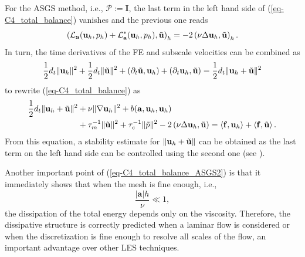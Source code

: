 For the ASGS method, i.e., $\mathcal{P}:=\mathbf{I}$, the last term in the left hand side of (\ref{eq-C4_total_balance}) vanishes and the previous one reads
\begin{equation}
\left(\mathcal{L}_{{\bf a}}({\bf u}_h,p_h)+\mathcal{L}^*_{{\bf a}}({\bf u}_h,p_h),\tilde{{\bf u}}\right)_h=
-2 \left(\nu\Delta{\bf u}_h,\tilde{{\bf u}}\right)_h.
\end{equation}
In turn, the time derivatives of the FE and subscale velocities can be combined as
\begin{align}
\label{eq-C4_time_deriv_ASGS}
\frac{1}{2}d_t\|{\bf u}_h\|^2+\frac{1}{2}d_t\|\tilde{{\bf u}}\|^2+(\partial_t\tilde{{\bf u}},{\bf u}_h)+\left(\partial_t{\bf u}_h,\tilde{{\bf u}}\right)=\frac{1}{2}d_t\|{\bf u}_h+\tilde{{\bf u}}\|^2
\end{align}
to rewrite (\ref{eq-C4_total_balance}) as
\begin{align}
\label{eq-C4_total_balance_ASGS2}
\frac{1}{2}d_t\|{\bf u}_h+\tilde{{\bf u}}\|^2
&+\nu\|\nabla{\bf u}_h\|^2+b({\bf a},{\bf u}_h,{\bf u}_h) \\ \nonumber
&+\tau_m^{-1}\|\tilde{{\bf u}}\|^2+\tau_c^{-1}\|\tilde{p}\|^2-2 \left(\nu\Delta{\bf u}_h,\tilde{{\bf u}}\right)=\left<\mathbf{f},\mathbf{u}_h\right>+\left<\mathbf{f},\tilde{{\bf u}}\right>.
\end{align}
From this equation, a stability estimate for $\|{\bf u}_h+\tilde{{\bf u}}\|$ can be obtained as the last term on the left hand side can be controlled using the second one (see \cite[Remark 4.7]{badia_multiscale_2009}).%

Another important point of (\ref{eq-C4_total_balance_ASGS2}) is that it immediately shows that when the mesh is fine enough, i.e., 
\begin{equation*}
\frac{\left| \mathbf{a}\right| h}{\nu }\ll 1,
\end{equation*}
the dissipation of the total energy depends only on the viscosity. Therefore, the dissipative structure is correctly predicted when a laminar flow is considered or when the discretization is fine enough to resolve all scales of the flow, an important advantage over other LES techniques.

